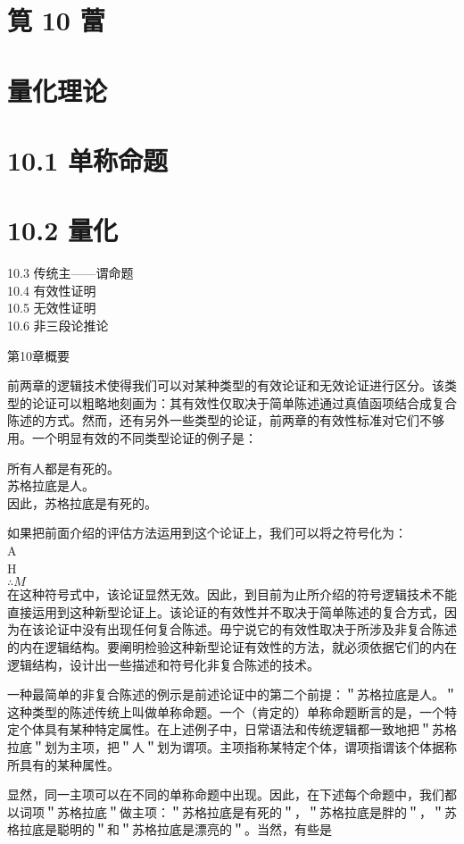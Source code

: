 \section*{筧 10 䔰}
\section*{量化理论}
\section*{10.1 单称命题}
\section*{10.2 量化}
10.3 传统主——谓命题\\
10.4 有效性证明\\
10.5 无效性证明\\
10.6 非三段论推论

第10章概要

前两章的逻辑技术使得我们可以对某种类型的有效论证和无效论证进行区分。该类型的论证可以粗略地刻画为：其有效性仅取决于简单陈述通过真值函项结合成复合陈述的方式。然而，还有另外一些类型的论证，前两章的有效性标准对它们不够用。一个明显有效的不同类型论证的例子是：

所有人都是有死的。\\
苏格拉底是人。\\
因此，苏格拉底是有死的。

如果把前面介绍的评估方法运用到这个论证上，我们可以将之符号化为：\\
A\\
H\\
$\therefore M$\\
在这种符号式中，该论证显然无效。因此，到目前为止所介绍的符号逻辑技术不能直接运用到这种新型论证上。该论证的有效性并不取决于简单陈述的复合方式，因为在该论证中没有出现任何复合陈述。毋宁说它的有效性取决于所涉及非复合陈述的内在逻辑结构。要阐明检验这种新型论证有效性的方法，就必须依据它们的内在逻辑结构，设计出一些描述和符号化非复合陈述的技术。

一种最简单的非复合陈述的例示是前述论证中的第二个前提：＂苏格拉底是人。＂这种类型的陈述传统上叫做单称命题。一个（肯定的）单称命题断言的是，一个特定个体具有某种特定属性。在上述例子中，日常语法和传统逻辑都一致地把＂苏格拉底＂划为主项，把＂人＂划为谓项。主项指称某特定个体，谓项指谓该个体据称所具有的某种属性。

显然，同一主项可以在不同的单称命题中出现。因此，在下述每个命题中，我们都以词项＂苏格拉底＂做主项：＂苏格拉底是有死的＂，＂苏格拉底是胖的＂，＂苏格拉底是聪明的＂和＂苏格拉底是漂亮的＂。当然，有些是

